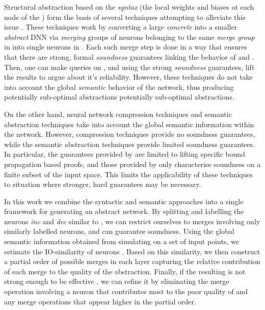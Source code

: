 Structural abstraction based on the \textit{syntax} (the local weights and biases at each
node of the \dnn) form the basis of several techniques attempting to alleviate
this issue \cite{cegar-nn, cegarette, cleverest-nn, conv-abs-gk}. These
techniques work by converting a large \textit{concrete} \dnn \cnc into a smaller
\textit{abstract} DNN \abs via \textit{merging} groups of neurons belonging to
the same \textit{merge group} in \cnc into single neurons in \abs. Each such
merge step is done in a way that ensures that there are strong, formal
\textit{soundness} guarantees linking the behavior of \cnc and \abs. Then, one
can make queries on \abs, and using the strong \textit{soundness} guarantees,
lift the results to \cnc argue about it's reliability. However, these techniques
do not take into account the global \textit{semantic} behavior of the network,
thus producing potentially sub-optimal abstractions potentially sub-optimal
abstractions. 

On the other hand, neural network compression techniques  and
semantic abstraction techniques \cite{deep-abstract, lin-comb-abs-jan} take into
account the global semantic information within the network. However,
compression techniques provide no soundness guarantees, while the semantic
abstraction techniques provide limited soundness guarantees. In particular, the
guarantees provided by \cite{deep-abstract} are limited to lifting specific
bound propagation based proofs, and those provided by \cite{lin-comb-abs-jan}
only characterise soundness on a finite subset of the input space. This limits the applicability
of these techniques to situation where stronger, hard guarantees may be
necessary.

In this work we combine the syntactic and semantic approaches into a single
framework for generating an abstract network. By splitting and labelling the
neurons \textit{inc} and \textit{dec} similar to \cite{cegar-nn}, we can
restrict ourselves to merges involving only similarly labelled neurons, and can
guarantee soundness. Using the global semantic information obtained from
simulating \cnc on a set of input points, we estimate the IO-similarity of
neurons . Based on this
similarity, we then construct a partial order of possible merges in each layer
capturing the relative contribution of each merge to the quality of the
abstraction. Finally, if the resulting \abs
is not strong enough to be effective , we can refine it by eliminating the merge operation involving
a neuron that contributes most to the poor quality  of \abs and any merge operations that appear higher in the partial
order.

